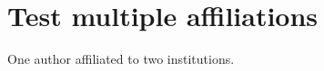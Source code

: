 \documentclass{jcls}
\author{
  surname = Test,
  given-names = Anonymous,
  affiliation = {a, b},
}
\affiliation{
  id = a,
  organization = Institute A, 
}
\affiliation{
  id = b,
  organization = Institute B, 
}
\begin{document}
\maketitle
\section{Test multiple affiliations} %
\label{sec:test_multiple_affiliations}

One author affiliated to two institutions.
\end{document}
